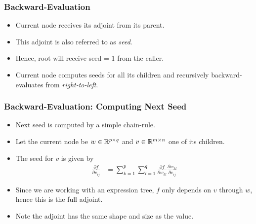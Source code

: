 \begin{frame}
\begin{figure}[t]
{

} %

\end{figure}
\end{frame}

\begin{frame}
\frametitle{Backward-Evaluation}
\begin{itemize}

\item Current node receives its adjoint from its parent.

\item This adjoint is also referred to as \emph{seed}.

\item Hence, root will receive seed = 1 from the caller.

\item Current node computes seeds for all its children and
    recursively backward-evaluates from \emph{right-to-left}.

\end{itemize}
\end{frame}

\begin{frame}
\frametitle{Backward-Evaluation: Computing Next Seed}
\begin{itemize}

\item Next seed is computed by a simple chain-rule.
\item Let the current node be $w \in \mathbb{R}^{p \times q}$ and $v \in \mathbb{R}^{m \times n}$ one of its children.
\item The seed for $v$ is given by
\begin{align}
    \frac{\partial f}{\partial v_{ij}} &=
        \sum\limits_{k=1}^p \sum\limits_{l=1}^q 
        \frac{\partial f}{\partial w_{kl}} \frac{\partial w_{kl}}{\partial v_{ij}}
    \label{eq:next-adj}
\end{align}
\item Since we are working with an expression tree,
    $f$ only depends on $v$ through $w$, hence this is the full adjoint.
\item Note the adjoint has the same shape and size as the value.

\end{itemize}
\end{frame}


